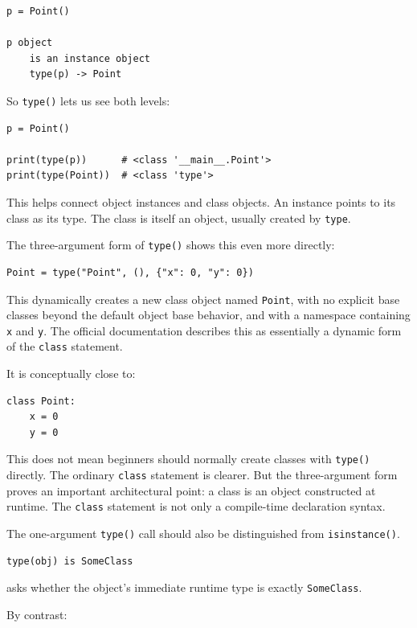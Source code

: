 \begin{verbatim}
p = Point()

p object
    is an instance object
    type(p) -> Point
\end{verbatim}

So \texttt{type()} lets us see both levels:

\begin{verbatim}
p = Point()

print(type(p))      # <class '__main__.Point'>
print(type(Point))  # <class 'type'>
\end{verbatim}

This helps connect object instances and class objects. An instance points to its class as its type. The class is itself an object, usually created by \texttt{type}.

The three-argument form of \texttt{type()} shows this even more directly:

\begin{verbatim}
Point = type("Point", (), {"x": 0, "y": 0})
\end{verbatim}

This dynamically creates a new class object named \texttt{Point}, with no explicit base classes beyond the default object base behavior, and with a namespace containing \texttt{x} and \texttt{y}. The official documentation describes this as essentially a dynamic form of the \texttt{class} statement. \cite{python_builtin_type}

It is conceptually close to:

\begin{verbatim}
class Point:
    x = 0
    y = 0
\end{verbatim}

This does not mean beginners should normally create classes with \texttt{type()} directly. The ordinary \texttt{class} statement is clearer. But the three-argument form proves an important architectural point: a class is an object constructed at runtime. The \texttt{class} statement is not only a compile-time declaration syntax.

The one-argument \texttt{type()} call should also be distinguished from \texttt{isinstance()}.

\begin{verbatim}
type(obj) is SomeClass
\end{verbatim}

asks whether the object's immediate runtime type is exactly \texttt{SomeClass}.

By contrast:

